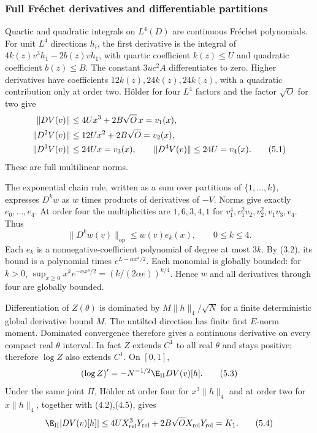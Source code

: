 \subsubsection{Full Fr\'echet derivatives and differentiable partitions}
Quartic and quadratic integrals on $L^4(D)$ are continuous Fr\'echet
polynomials. For unit $L^4$ directions $h_i$, the first derivative is the
integral of $4k(z)v^3h_1-2b(z)vh_1$, with quartic coefficient $k(z)\le U$
and quadratic coefficient $b(z)\le B$. The constant $3uc^2A$
differentiates to zero. Higher derivatives have coefficients
$12k(z),24k(z),24k(z)$, with a quadratic contribution only at order two.
H\"older for four $L^4$ factors and the factor $\sqrt O$ for two give
\begin{align}
 \|DV(v)\|&\le4Ux^3+2B\sqrt O\,x=v_1(x),\notag\\
 \|D^2V(v)\|&\le12Ux^2+2B\sqrt O=v_2(x),\notag\\
 \|D^3V(v)\|&\le24Ux=v_3(x),\qquad
 \|D^4V(v)\|\le24U=v_4(x).\tag{5.1}
\end{align}
These are full multilinear norms.

The exponential chain rule, written as a sum over partitions of
$\{1,\ldots,k\}$, expresses $D^kw$ as $w$ times products of derivatives
of $-V$. Norms give exactly $e_0,\ldots,e_4$. At order four the
multiplicities are $1,6,3,4,1$ for
$v_1^4,v_1^2v_2,v_2^2,v_1v_3,v_4$. Thus
\begin{equation}
 \|D^kw(v)\|_{\mathrm{op}}\le w(v)e_k(x),\qquad0\le k\le4.\tag{5.2}
\end{equation}
Each $e_k$ is a nonnegative-coefficient polynomial of degree at most $3k$.
By (3.2), its bound is a polynomial times $e^{L-\alpha x^4/2}$.
Each monomial is globally bounded: for $k>0$,
$\sup_{x\ge0}x^ke^{-\alpha x^4/2}=(k/(2\alpha e))^{k/4}$.
Hence $w$ and all derivatives through four are globally bounded.

Differentiation of $Z(\theta)$ is dominated by
$M\|h\|_4/\sqrt N$ for a finite deterministic global derivative bound $M$.
The untilted direction has finite first $E$-norm moment. Dominated
convergence therefore gives a continuous derivative on every compact real
$\theta$ interval. In fact $Z$ extends $C^1$ to all real $\theta$ and stays
positive; therefore $\log Z$ also extends $C^1$. On $[0,1]$,
\begin{equation}
 (\log Z)'=-N^{-1/2}\E_\Pi DV(v)[h].\tag{5.3}
\end{equation}
Under the same joint $\Pi$, H\"older at order four for $x^3\|h\|_4$ and
at order two for $x\|h\|_4$, together with (4.2),(4.5), gives
\begin{equation}
 \E_\Pi|DV(v)[h]|\le4UX_{\mathrm{rel}}^3Y_{\mathrm{rel}}
       +2B\sqrt O X_{\mathrm{rel}}Y_{\mathrm{rel}}=K_1.\tag{5.4}
\end{equation}

